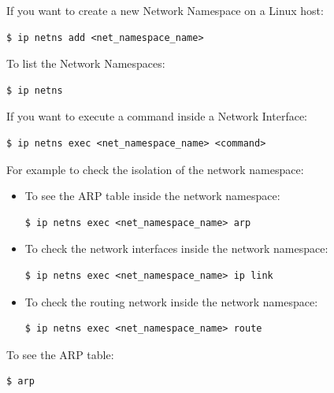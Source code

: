 \documentclass{article}
\newenvironment{codetemplate}[1][]{%
  \mybasecolorbox[#1]
  \itshape
}{%
  \endmybasecolorbox
}
\begin{document}
If you want to create a new Network Namespace on a Linux host:
\begin{codetemplate}{}
\begin{verbatim}
$ ip netns add <net_namespace_name>
\end{verbatim}
\end{codetemplate}

To list the Network Namespaces:
\begin{codetemplate}{}
\begin{verbatim}
$ ip netns
\end{verbatim}
\end{codetemplate}

If you want to execute a command inside a Network Interface:
\begin{codetemplate}{}
\begin{verbatim}
$ ip netns exec <net_namespace_name> <command>
\end{verbatim}
\end{codetemplate}

For example to check the isolation of the network namespace:
\begin{itemize}
    \item To see the ARP table inside the network namespace:
\begin{codetemplate}{}
\begin{verbatim}
$ ip netns exec <net_namespace_name> arp
\end{verbatim}
\end{codetemplate}
    \item To check the network interfaces inside the network namespace:
\begin{codetemplate}{}
\begin{verbatim}
$ ip netns exec <net_namespace_name> ip link
\end{verbatim}
\end{codetemplate}
    \item To check the routing network inside the network namespace:
\begin{codetemplate}{}
\begin{verbatim}
$ ip netns exec <net_namespace_name> route
\end{verbatim}
\end{codetemplate}
\end{itemize}

To see the ARP table:
\begin{codetemplate}{}
\begin{verbatim}
$ arp
\end{verbatim}
\end{codetemplate}
\end{document}
